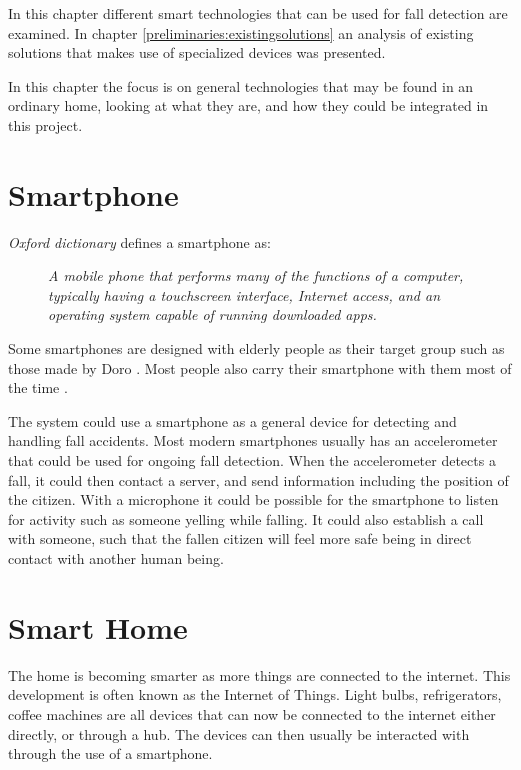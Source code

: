 \label{chap:technologies}
In this chapter different smart technologies that can be used for fall detection are examined. In chapter \ref{preliminaries:existingsolutions} an analysis of existing solutions that makes use of specialized devices was presented.

In this chapter the focus is on general technologies that may be found in an ordinary home, looking at what they are, and how they could be integrated in this project.


\section{Smartphone} \label{technologies:smartphone}
\textit{Oxford dictionary} defines a smartphone as:
\begin{figure}[H]
    \begin{center}
        \textit{A mobile phone that performs many of the functions of a computer, typically having a touchscreen interface, Internet access, and an operating system capable of running downloaded apps.} \cite{oxford:smartphone}
    \end{center}
\end{figure}
Some smartphones are designed with elderly people as their target group such as those made by Doro \cite{doro}. Most people also carry their smartphone with them most of the time \cite{smartphonecarry}.

The system could use a smartphone as a general device for detecting and handling fall accidents. Most modern smartphones usually has an accelerometer that could be used for ongoing fall detection. When the accelerometer detects a fall, it could then contact a server, and send information including the position of the citizen. With a microphone it could be possible for the smartphone to listen for activity such as someone yelling while falling. It could also establish a call with someone, such that the fallen citizen will feel more safe being in direct contact with another human being.

\section{Smart Home}
The home is becoming smarter as more things are connected to the internet. This development is often known as the Internet of Things. Light bulbs, refrigerators, coffee machines are all devices that can now be connected to the internet either directly, or through a hub. The devices can then usually be interacted with through the use of a smartphone.

